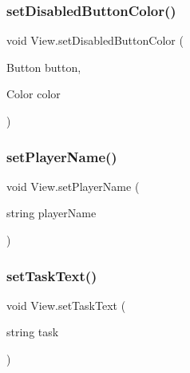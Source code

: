 \mbox{\label{classView_a6d8bb240232381d2018d3b26393b51c0}} 
\subsubsection{\texorpdfstring{set\+Disabled\+Button\+Color()}{setDisabledButtonColor()}}
{\footnotesize\ttfamily void View.\+set\+Disabled\+Button\+Color (\begin{DoxyParamCaption}\item[{Button}]{button,  }\item[{Color}]{color }\end{DoxyParamCaption})\hspace{0.3cm}{\ttfamily [inline]}}

\mbox{\label{classView_ade124fb0c6d19ad9c4ff64f58b37d13b}} 
\subsubsection{\texorpdfstring{set\+Player\+Name()}{setPlayerName()}}
{\footnotesize\ttfamily void View.\+set\+Player\+Name (\begin{DoxyParamCaption}\item[{string}]{player\+Name }\end{DoxyParamCaption})\hspace{0.3cm}{\ttfamily [inline]}}

\mbox{\label{classView_a6fd402a60f74017d20a321e05d8bc787}} 
\subsubsection{\texorpdfstring{set\+Task\+Text()}{setTaskText()}}
{\footnotesize\ttfamily void View.\+set\+Task\+Text (\begin{DoxyParamCaption}\item[{string}]{task }\end{DoxyParamCaption})\hspace{0.3cm}{\ttfamily [inline]}}

